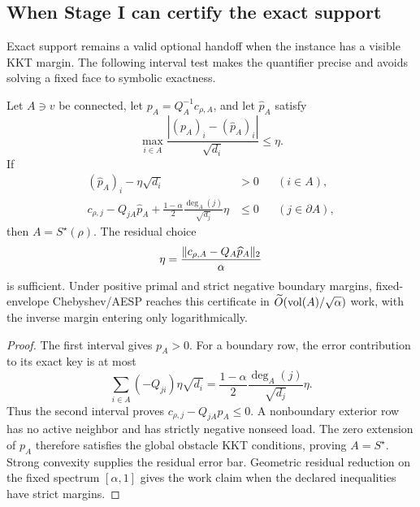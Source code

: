 \subsection{When Stage I can certify the exact support}

Exact support remains a valid optional handoff when the instance has a
visible KKT margin.  The following interval test makes the quantifier precise
and avoids solving a fixed face to symbolic exactness.

\begin{proposition}
\label{prop:two-stage-interval-face-verifier}
Let $A\ni v$ be connected, let
$p_A=Q_A^{-1}c_{\rho,A}$, and let $\widehat p_A$ satisfy
\begin{equation}
 \max_{i\in A}
 \frac{|(p_A)_i-(\widehat p_A)_i|}{\sqrt{d_i}}
 \leq\eta.
 \label{eq:two-stage-face-error-bar}
\end{equation}
If
\begin{align}
 (\widehat p_A)_i-\eta\sqrt{d_i}&>0 &&(i\in A),
 \label{eq:two-stage-face-primal-interval}\\
 c_{\rho,j}-Q_{jA}\widehat p_A
 +\frac{1-\alpha}{2}
  \frac{\deg_A(j)}{\sqrt{d_j}}\eta&\leq0
 &&(j\in\partial A),
 \label{eq:two-stage-face-dual-interval}
\end{align}
then $A=S^\star(\rho)$.  The residual choice
\begin{equation*}
 \eta=\frac{\lVert c_{\rho,A}-Q_A\widehat p_A\rVert_2}{\alpha}
\end{equation*}
is sufficient.  Under positive primal and strict negative boundary margins,
fixed-envelope Chebyshev/AESP reaches this certificate in
$\widetilde O(\operatorname{vol}(A)/\sqrt\alpha)$ work, with the inverse margin entering
only logarithmically.
\end{proposition}

\begin{proof}
The first interval gives $p_A>0$.  For a boundary row, the error contribution
to its exact key is at most
\begin{equation*}
 \sum_{i\in A}(-Q_{ji})\eta\sqrt{d_i}
 =\frac{1-\alpha}{2}
   \frac{\deg_A(j)}{\sqrt{d_j}}\eta.
\end{equation*}
Thus the second interval proves
$c_{\rho,j}-Q_{jA}p_A\leq0$.  A nonboundary exterior row has no active
neighbor and has strictly negative nonseed load.  The zero extension of
$p_A$ therefore satisfies the global obstacle KKT conditions, proving
$A=S^\star$.  Strong convexity supplies the residual error bar.  Geometric
residual reduction on the fixed spectrum $[\alpha,1]$ gives the work claim
when the declared inequalities have strict margins.
\end{proof}

